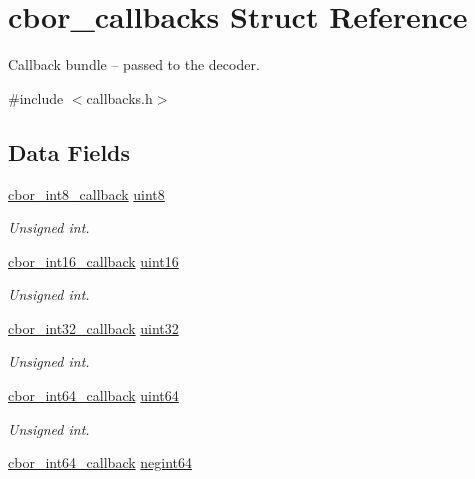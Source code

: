 \hypertarget{structcbor__callbacks}{\section{cbor\-\_\-callbacks Struct Reference}
\label{structcbor__callbacks}
}


Callback bundle -- passed to the decoder.  




{\ttfamily \#include $<$callbacks.\-h$>$}

\subsection*{Data Fields}
\begin{DoxyCompactItemize}
\item 
\hyperlink{callbacks_8h_a2b9b84ad36e0fc4d1498413d8497899e}{cbor\-\_\-int8\-\_\-callback} \hyperlink{structcbor__callbacks_af2d69429c9bc71edf55b6f4f1dbb76d1}{uint8}
\begin{DoxyCompactList}\small\item\em Unsigned int. \end{DoxyCompactList}\item 
\hyperlink{callbacks_8h_a663bfb4b82d31d5eeeffc6db48b487c6}{cbor\-\_\-int16\-\_\-callback} \hyperlink{structcbor__callbacks_a3eb2039fa03bd534d6be0ed10d0c98be}{uint16}
\begin{DoxyCompactList}\small\item\em Unsigned int. \end{DoxyCompactList}\item 
\hyperlink{callbacks_8h_a3c9d3bfd7f55faa430ba58ce9ebf9cfe}{cbor\-\_\-int32\-\_\-callback} \hyperlink{structcbor__callbacks_af2501b53c0150c4d3244a039b3232bf1}{uint32}
\begin{DoxyCompactList}\small\item\em Unsigned int. \end{DoxyCompactList}\item 
\hyperlink{callbacks_8h_a1ba7b7117064e3b6d13c1a1414b325b1}{cbor\-\_\-int64\-\_\-callback} \hyperlink{structcbor__callbacks_a2b0328261726fba55f663f55f954d56b}{uint64}
\begin{DoxyCompactList}\small\item\em Unsigned int. \end{DoxyCompactList}\item 
\hyperlink{callbacks_8h_a1ba7b7117064e3b6d13c1a1414b325b1}{cbor\-\_\-int64\-\_\-callback} \hyperlink{structcbor__callbacks_ac0a4f4915ecb9924132c60c7fe7d93fe}{negint64}

\end{DoxyCompactItemize}
